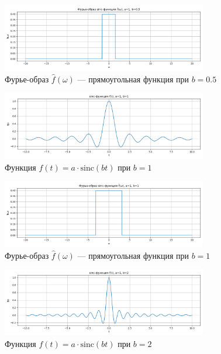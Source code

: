 \begin{figure}[H]
    \centering
    \includegraphics[width=0.8\textwidth]{sinc_spectrum_b0.5.png}
    \caption{Фурье-образ $\hat{f}(\omega)$ — прямоугольная функция при $b = 0.5$}
\end{figure}

\begin{figure}[H]
    \centering
    \includegraphics[width=0.8\textwidth]{sinc_function_b1.png}
    \caption{Функция $f(t) = a \cdot \mathrm{sinc}(bt)$ при $b = 1$}
\end{figure}

\begin{figure}[H]
    \centering
    \includegraphics[width=0.8\textwidth]{sinc_spectrum_b1.png}
    \caption{Фурье-образ $\hat{f}(\omega)$ — прямоугольная функция при $b = 1$}
\end{figure}

\begin{figure}[H]
    \centering
    \includegraphics[width=0.8\textwidth]{sinc_function_b2.png}
    \caption{Функция $f(t) = a \cdot \mathrm{sinc}(bt)$ при $b = 2$}
\end{figure}

